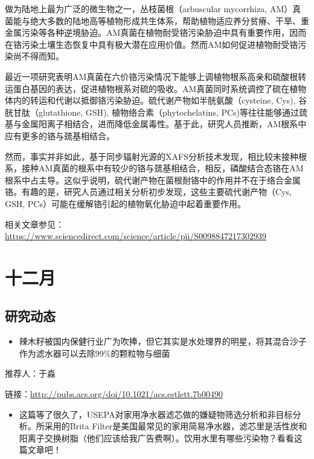 \documentclass[
]{book}
\providecommand{\tightlist}{%
  \setlength{\itemsep}{0pt}\setlength{\parskip}{0pt}}
\begin{document}
做为陆地上最为广泛的微生物之一，丛枝菌根（arbuscular mycorrhiza, AM）真菌能与绝大多数的陆地高等植物形成共生体系，帮助植物适应养分贫瘠、干旱、重金属污染等各种逆境胁迫。AM真菌在植物耐受铬污染胁迫中具有重要作用，因而在铬污染土壤生态恢复中具有极大潜在应用价值。然而AM如何促进植物耐受铬污染尚不得而知。

最近一项研究表明AM真菌在六价铬污染情况下能够上调植物根系高亲和硫酸根转运蛋白基因的表达，促进植物根系对硫的吸收。AM真菌同时系统调控了硫在植物体内的转运和代谢以抵御铬污染胁迫。硫代谢产物如半胱氨酸（cysteine, Cys), 谷胱甘肽（glutathione, GSH), 植物络合素（phytochelatins, PCs)等往往能够通过巯基与金属阳离子相结合，进而降低金属毒性。基于此，研究人员推断，AM根系中应有更多的铬与巯基相结合。

然而，事实并非如此，基于同步辐射光源的XAFS分析技术发现，相比较未接种根系，接种AM真菌的根系中有较少的铬与巯基相结合，相反，磷酸结合态铬在AM根系中占主导。这似乎说明，硫代谢产物在菌根耐铬中的作用并不在于络合金属铬。有趣的是，研究人员通过相关分析初步发现，这些主要硫代谢产物（Cys, GSH, PCs）可能在缓解铬引起的植物氧化胁迫中起着重要作用。

相关文章参见：\url{https://www.sciencedirect.com/science/article/pii/S0098847217302939}

\hypertarget{ux5341ux4e8cux6708}{%
\section*{十二月}\label{ux5341ux4e8cux6708}}

\hypertarget{ux7814ux7a76ux52a8ux6001-1}{%
\subsection*{研究动态}\label{ux7814ux7a76ux52a8ux6001-1}}

\begin{itemize}
\tightlist
\item
  辣木籽被国内保健行业广为吹捧，但它其实是水处理界的明星，将其混合沙子作为滤水器可以去除99\%的颗粒物与细菌
\end{itemize}

推荐人：于淼

链接：\url{http://pubs.acs.org/doi/10.1021/acs.estlett.7b00490}

\begin{itemize}
\tightlist
\item
  这篇等了很久了，USEPA对家用净水器滤芯做的嫌疑物筛选分析和非目标分析。所采用的Brita Filter是美国最常见的家用简易净水器，滤芯里是活性炭和阳离子交换树脂（他们应该给我广告费啊）。饮用水里有哪些污染物？看看这篇文章吧！
\end{itemize}
\end{document}
